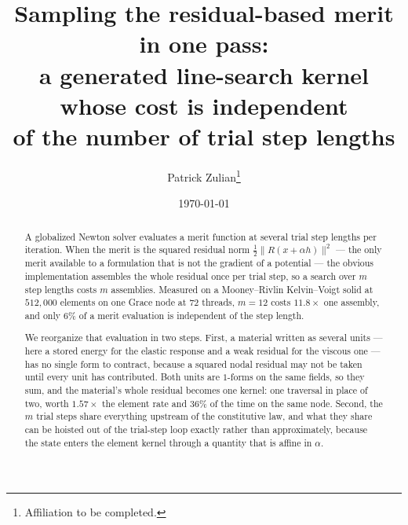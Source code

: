 \documentclass[11pt]{article}
\title{Sampling the residual-based merit in one pass:\\
       a generated line-search kernel whose cost is independent\\
       of the number of trial step lengths}
\author{Patrick Zulian\thanks{Affiliation to be completed.}}
\date{\today}
\begin{document}
\maketitle

\begin{abstract}
A globalized Newton solver evaluates a merit function at several trial step
lengths per iteration.  When the merit is the squared residual norm
$\tfrac12\|R(x+\alpha h)\|^2$ --- the only merit available to a formulation that
is not the gradient of a potential --- the obvious implementation assembles the
whole residual once per trial step, so a search over $m$ step lengths costs $m$
assemblies.  Measured on a Mooney--Rivlin Kelvin--Voigt solid at $512{,}000$
elements on one Grace node at $72$ threads, $m=12$ costs $11.8\times$ one
assembly, and only $6\%$ of a merit evaluation is independent of the step
length.

We reorganize that evaluation in two steps.  First, a material written as
several units --- here a stored energy for the elastic response and a weak
residual for the viscous one --- has no single form to contract, because a
squared nodal residual may not be taken until every unit has contributed.  Both
units are $1$-forms on the same fields, so they sum, and the material's whole
residual becomes one kernel: one traversal in place of two, worth $1.57\times$
the element rate and $36\%$ of the time on the same node.  Second, the $m$ trial
steps share everything upstream of the constitutive law, and what they share can
be hoisted out of the trial-step loop exactly rather than approximately, because
the state enters the element kernel through a quantity that is affine in
$\alpha$.


\end{abstract}
\end{document}
